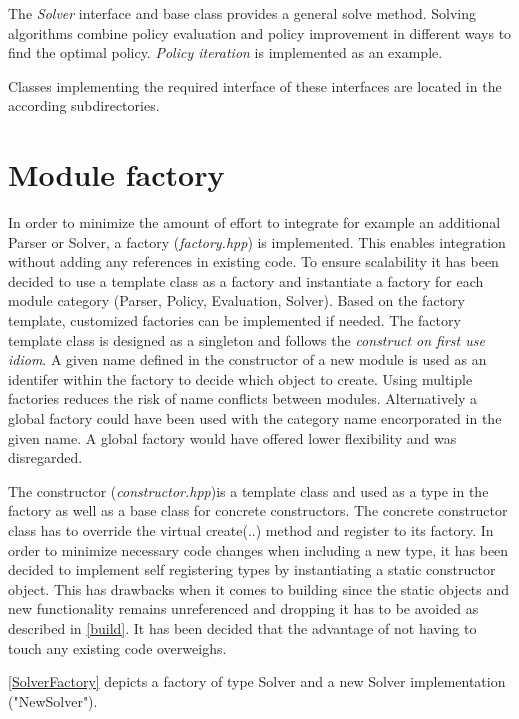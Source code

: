 The \emph{Solver} interface and base class provides a general solve method. Solving algorithms combine policy evaluation and policy improvement in different ways to find the optimal policy. \emph{Policy iteration} is implemented as an example.

Classes implementing the required interface of these interfaces are located in the according subdirectories. 

\section{Module factory}
\label{integration}

In order to minimize the amount of effort to integrate for example an additional Parser or Solver, a factory (\emph{factory.hpp}) is implemented. This enables integration without adding any references in existing code. To ensure scalability it has been decided to use a template class as a factory and instantiate a factory for each module category (Parser, Policy, Evaluation, Solver). Based on the factory template, customized factories can be implemented if needed. The factory template class is designed as a singleton and follows the \emph{construct on first use idiom}. A given name defined in the constructor of a new module is used as an identifer within the factory to decide which object to create. Using multiple factories reduces the risk of name conflicts between modules.  Alternatively a global factory could have been used with the category name encorporated in the given name. A global factory would have offered lower flexibility and was disregarded. 

The constructor (\emph{constructor.hpp})is a template class and used as a type in the factory as well as a base class for concrete constructors. The concrete constructor class has to override the virtual create(..) method and register to its factory.
In order to minimize necessary code changes when including a new type, it has been decided to implement self registering types by instantiating a static constructor object. This has drawbacks when it comes to building since the static objects and new functionality remains unreferenced and dropping it has to be avoided as described in \autoref{build}. 
It has been decided that the advantage of not having to touch any existing code overweighs. 

\autoref{SolverFactory} depicts a factory of type Solver and a new Solver implementation ("NewSolver"). 

